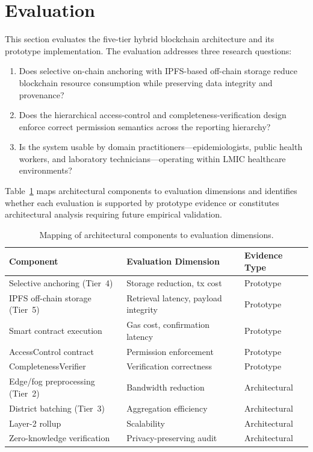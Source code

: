 \section{Evaluation}\label{sec:evaluation}

This section evaluates the five-tier hybrid blockchain architecture and its prototype implementation. The evaluation addresses three research questions:

\begin{enumerate}
\item[\textbf{EQ1.}] Does selective on-chain anchoring with IPFS-based off-chain storage reduce blockchain resource consumption while preserving data integrity and provenance?
\item[\textbf{EQ2.}] Does the hierarchical access-control and completeness-verification design enforce correct permission semantics across the reporting hierarchy?
\item[\textbf{EQ3.}] Is the system usable by domain practitioners---epidemiologists, public health workers, and laboratory technicians---operating within LMIC healthcare environments?
\end{enumerate}

Table~\ref{tab:eval_mapping} maps architectural components to evaluation dimensions and identifies whether each evaluation is supported by prototype evidence or constitutes architectural analysis requiring future empirical validation.

\begin{table}[!ht]
\caption{Mapping of architectural components to evaluation dimensions.}\label{tab:eval_mapping}
\centering
\small
\begin{tabular}{p{3.2cm}p{2.4cm}p{2.0cm}}
\toprule
\textbf{Component} & \textbf{Evaluation Dimension} & \textbf{Evidence Type} \\
\midrule
Selective anchoring (Tier~4) & Storage reduction, tx cost & Prototype \\
IPFS off-chain storage (Tier~5) & Retrieval latency, payload integrity & Prototype \\
Smart contract execution & Gas cost, confirmation latency & Prototype \\
AccessControl contract & Permission enforcement & Prototype \\
CompletenessVerifier & Verification correctness & Prototype \\
Edge/fog preprocessing (Tier~2) & Bandwidth reduction & Architectural \\
District batching (Tier~3) & Aggregation efficiency & Architectural \\
Layer-2 rollup & Scalability & Architectural \\
Zero-knowledge verification & Privacy-preserving audit & Architectural \\
\bottomrule
\end{tabular}
\end{table}

